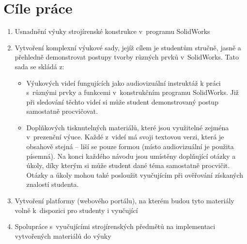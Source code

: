\chapter{Cíle práce}

\begin{enumerate}[topsep=0pt]
    \setlength\itemsep{0em}
    \item Usnadnění výuky strojírenské konstrukce v~programu SolidWorks
    \item Vytvoření komplexní výukové sady, jejíž cílem je studentům stručně, jasně a přehledně demonstrovat postupy tvorby různých prvků v~SolidWorks. Tato sada se skládá z:
    \begin{itemize}[topsep=0pt]
        \setlength\itemsep{0em}
        \item Výukových videí fungujících jako audiovizuální instruktáž k práci s~různými prvky a funkcemi v~konstrukčním programu SolidWorks. Již při sledování těchto videí si může student demonstrovaný postup samostatně procvičovat. 
        \item Doplňkových tisknutelných materiálů, které jsou využitelné zejména v~prezenční výuce. Každé z~videí má svoji textovou verzi, která je obsahově stejná -- liší se pouze formou (místo audiovizuální je použita písemná). Na konci každého návodu jsou umístěny doplňující otázky a úkoly, díky kterým si může student dané téma samostatně procvičit. Otázky a úkoly mohou také posloužit vyučujícím při ověřování získaných znalostí studenta. 
    \end{itemize}
    \item Vytvoření platformy (webového portálu), na kterém budou tyto materiály volně k~dispozici pro studenty i vyučující
    \item Spolupráce s~vyučujícími strojírenských předmětů na implementaci vytvořených materiálů do výuky
\end{enumerate}
